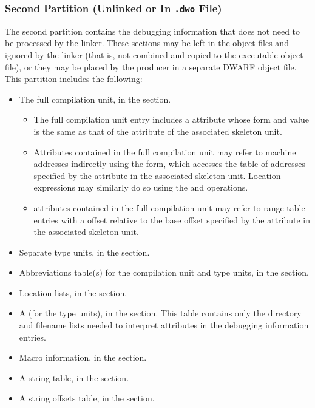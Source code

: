 \subsubsection{Second Partition (Unlinked or In \texttt{.dwo} File)}
The second partition contains the debugging information that
does not need to be processed by the linker. These sections
may be left in the object files and ignored by the linker
(that is, not combined and copied to the executable object file), or
they may be placed by the producer in a separate DWARF object
file. This partition includes the following:
\begin{itemize}
\item
The full compilation unit, in the \dotdebuginfodwo{} section.
\begin{itemize}
\item
The full compilation unit entry includes a \DWATdwoid{} 
attribute whose form and value is the same as that of the \DWATdwoid{} 
attribute of the associated skeleton unit.
\item
Attributes contained in the full compilation unit
may refer to machine addresses indirectly using the \DWFORMaddrx{} 
form, which accesses the table of addresses specified by the
\DWATaddrbase{} attribute in the associated skeleton unit.
Location expressions may similarly do so using the \DWOPaddrx{} and
\DWOPconstx{} operations. 
\item
\DWATranges{} attributes contained in the full compilation unit
may refer to range table entries with a \DWFORMsecoffset{} offset 
relative to the base offset specified by the \DWATrangesbase{}
attribute in the associated skeleton unit.
\end{itemize}
\item Separate type units, in the \dotdebuginfodwo{} section.

\item
Abbreviations table(s) for the compilation unit and type
units, in the \dotdebugabbrevdwo{} section.

\item Location lists, in the \dotdebuglocdwo{} section.

\item
A  (for the type units), 
in the \dotdebuglinedwo{} section. This table
contains only the directory and filename lists needed to
interpret \DWATdeclfile{} attributes in the debugging
information entries.

\item Macro information, in the \dotdebugmacrodwo{} section.

\item A string table, in the \dotdebugstrdwo{} section.

\item A string offsets table, in the \dotdebugstroffsetsdwo{}
section.
\end{itemize}

